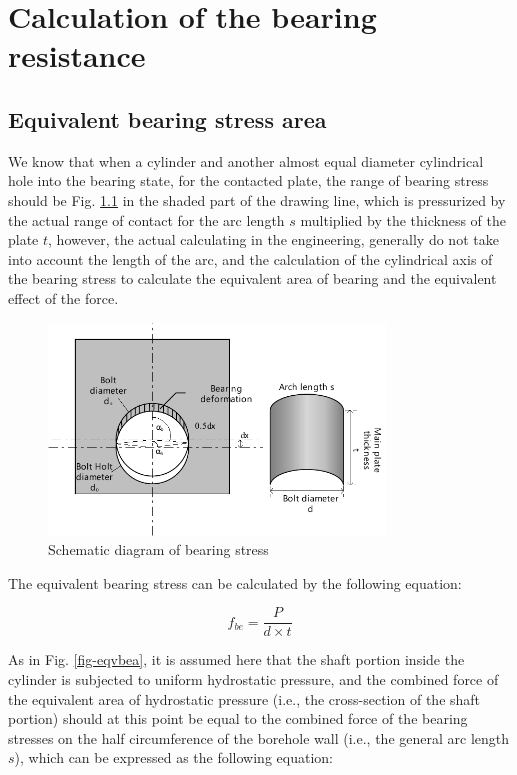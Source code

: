 \chapter{Calculation of the bearing resistance}
\label{app1}
\onehalfspacing



\section{Equivalent bearing stress area}

We know that when a cylinder and another almost equal diameter cylindrical hole into the bearing state, for the contacted plate, the range of bearing stress should be Fig. \ref{fig-shce-bea} in the shaded part of the drawing line, which is pressurized by the actual range of contact for the arc length $s$ multiplied by the thickness of the plate $t$, however, the actual calculating in the engineering, generally do not take into account the length of the arc, and the calculation of the cylindrical axis of the bearing stress to calculate the equivalent area of bearing and the equivalent effect of the force.

\begin{figure}
    \centering
    \includegraphics[width=0.8\textwidth]{imgs/app/shce-bea.pdf}
    \caption{Schematic diagram of bearing stress}
    \label{fig-shce-bea}
\end{figure}

The equivalent bearing stress can be calculated by the following equation:

\begin{equation}
    f_{be} = \frac{P}{d \times t}
\end{equation}


As in Fig. \ref{fig-eqvbea}, it is assumed here that the shaft portion inside the cylinder is subjected to uniform hydrostatic pressure, and the combined force of the equivalent area of hydrostatic pressure (i.e., the cross-section of the shaft portion) should at this point be equal to the combined force of the bearing stresses on the half circumference of the borehole wall (i.e., the general arc length $s$), which can be expressed as the following equation:


